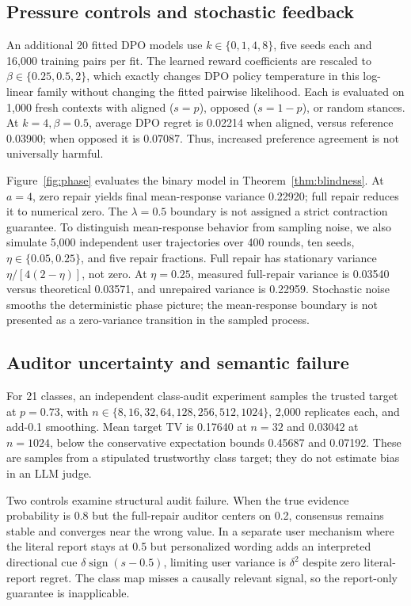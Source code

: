 \documentclass{article}
\begin{document}
\subsection{Pressure controls and stochastic feedback}
An additional 20 fitted DPO models use $k\in\{0,1,4,8\}$, five seeds each and
16,000 training pairs per fit. The learned reward coefficients are rescaled to
$\beta\in\{0.25,0.5,2\}$, which exactly changes DPO policy temperature in this
log-linear family without changing the fitted pairwise likelihood. Each is
evaluated on 1,000 fresh contexts with aligned ($s=p$), opposed ($s=1-p$), or
random stances. At $k=4,\beta=0.5$, average DPO regret is 0.02214 when aligned,
versus reference 0.03900; when opposed it is 0.07087. Thus, increased
preference agreement is not universally harmful.

Figure~\ref{fig:phase} evaluates the binary model in
Theorem~\ref{thm:blindness}.
At $a=4$, zero repair yields final mean-response variance 0.22920; full repair
reduces it to numerical zero. The $\lambda=0.5$ boundary is not assigned a
strict contraction guarantee. To distinguish mean-response behavior from sampling noise, we also simulate 5,000 independent user trajectories over
400 rounds, ten seeds, $\eta\in\{0.05,0.25\}$, and five repair fractions.
Full repair has stationary variance $\eta/[4(2-\eta)]$, not zero. At
$\eta=0.25$, measured full-repair variance is 0.03540 versus theoretical
0.03571, and unrepaired variance is 0.22959. Stochastic noise smooths the
deterministic phase picture; the mean-response boundary is not presented as a
zero-variance transition in the sampled process.

\subsection{Auditor uncertainty and semantic failure}
For 21 classes, an independent class-audit experiment samples the trusted
target at $p=0.73$, with $n\in\{8,16,32,64,128,256,512,1024\}$, 2,000
replicates each, and add-0.1 smoothing. Mean target TV is 0.17640 at $n=32$
and 0.03042 at $n=1024$, below the conservative expectation bounds 0.45687
and 0.07192. These are samples from a stipulated trustworthy class target;
they do not estimate bias in an LLM judge.

Two controls examine structural audit failure. When the true evidence probability is
0.8 but the full-repair auditor centers on 0.2, consensus remains stable and
converges near the wrong value. In a separate user mechanism where the literal
report stays at 0.5 but personalized wording adds an interpreted directional
cue $\delta\operatorname{sign}(s-0.5)$, limiting user variance is
$\delta^2$ despite zero literal-report regret. The class map misses a causally
relevant signal, so the report-only guarantee is inapplicable.
\end{document}
